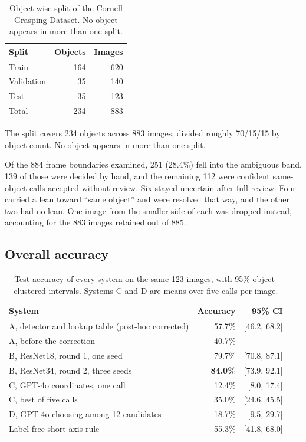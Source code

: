 \documentclass[12pt,letterpaper]{article}
\begin{document}
\begin{table}[H]
\centering
\caption{Object-wise split of the Cornell Grasping Dataset. No object
appears in more than one split.}
\label{tab:split}
\begin{tabular}{lrr}
\toprule
Split & Objects & Images \\
\midrule
Train      & 164 & 620 \\
Validation &  35 & 140 \\
Test       &  35 & 123 \\
\midrule
Total      & 234 & 883 \\
\bottomrule
\end{tabular}
\end{table}

The split covers 234 objects across 883 images, divided roughly 70/15/15
by object count. No object appears in more than one split.

Of the 884 frame boundaries examined, 251 (28.4\%) fell into the
ambiguous band. 139 of those were decided by hand, and the remaining 112
were confident same-object calls accepted without review. Six stayed
uncertain after full review. Four carried a lean toward ``same object''
and were resolved that way, and the other two had no lean. One image
from the smaller side of each was dropped instead, accounting for the
883 images retained out of 885.

\subsection{Overall accuracy}

\begin{table}[H]
\centering
\caption{Test accuracy of every system on the same 123 images, with 95\%
object-clustered intervals. Systems C and D are means over five calls
per image.}
\label{tab:summary}
\begin{tabular}{lrr}
\toprule
System & Accuracy & 95\% CI \\
\midrule
A, detector and lookup table (post-hoc corrected) & 57.7\% & [46.2, 68.2] \\
A, before the correction                          & 40.7\% & --- \\
B, ResNet18, round 1, one seed                    & 79.7\% & [70.8, 87.1] \\
B, ResNet34, round 2, three seeds                 & \textbf{84.0\%} & [73.9, 92.1] \\
C, GPT-4o coordinates, one call                   & 12.4\% & [8.0, 17.4] \\
C, best of five calls                             & 35.0\% & [24.6, 45.5] \\
D, GPT-4o choosing among 12 candidates            & 18.7\% & [9.5, 29.7] \\
Label-free short-axis rule                        & 55.3\% & [41.8, 68.0] \\
\bottomrule
\end{tabular}
\end{table}
\end{document}
